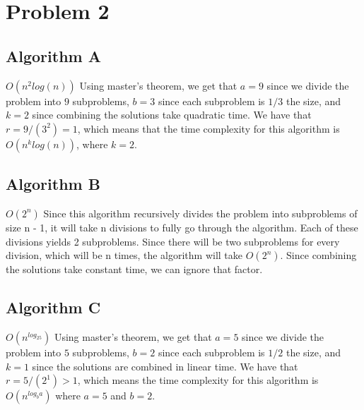 \documentclass[12pt]{article}
\begin{document}
\newpage
\section*{Problem 2}
\subsection*{Algorithm A}
$O(n^2log(n))$
\newline
Using master's theorem, we get that $a=9$ since we divide the problem into $9$
subproblems, $b=3$ since each subproblem is $1/3$ the size, and $k=2$ since combining
the solutions take quadratic time. We have that $r=9/(3^2)=1$, which means that the
time complexity for this algorithm is $O(n^klog(n))$, where $k=2$.
\subsection*{Algorithm B}
$O(2^n)$
\newline
Since this algorithm recursively divides the problem into subproblems of size n - 1, it will
take n divisions to fully go through the algorithm. Each of these divisions yields 2 subproblems.
Since there will be two subproblems for every division, which will be n times, the algorithm
will take $O(2^n)$. Since combining the solutions take constant time, we can ignore that factor.
\subsection*{Algorithm C}
$O(n^{log_25})$
\newline
Using master's theorem, we get that $a=5$ since we divide the problem into $5$ 
subproblems, $b=2$ since each subproblem is $1/2$ the size, and $k=1$ since the solutions
are combined in linear time. We have that $r=5/(2^1)>1$, which means the time complexity
for this algorithm is $O(n^{log_ba})$ where $a=5$ and $b=2$. 

\newpage
\end{document}
